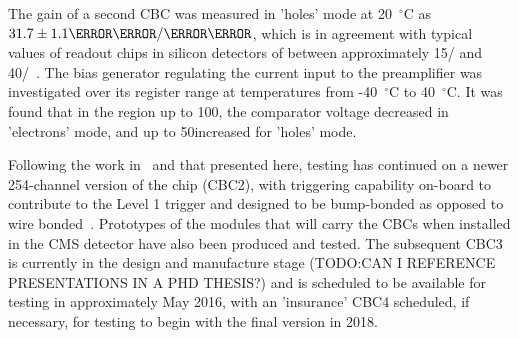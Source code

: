 The gain of a second CBC was measured in 'holes' mode at 20~$^{\circ}$C as $31.7\pm1.1\mathrm{\mV/\fC}$, which
is in agreement with typical values of readout chips in silicon detectors of between approximately 15\mV/\fC
and 40\mV/\fC~\cite{Kaplon:2001jh}. The bias generator regulating the current input to the preamplifier was
investigated over its register range at temperatures from -40~$^{\circ}$C to 40~$^{\circ}$C. It was found that in the region up to 100\uA, the
comparator voltage decreased in 'electrons' mode, and up to 50\uA increased for 'holes' mode. 

Following the work in~\cite{JacobJA} and that presented here, testing has continued on a newer 254-channel
version of the chip (CBC2), with triggering capability on-board to contribute to the Level 1 trigger and
designed to be bump-bonded as opposed to wire bonded~\cite{Klein:1628930,Abbaneo:1452189}.
Prototypes of the modules that will carry the CBCs when installed in the CMS detector have also been produced
and tested. The subsequent CBC3 is currently in the design and manufacture stage (TODO:CAN I REFERENCE
PRESENTATIONS IN A PHD THESIS?) and is scheduled to be available for testing in approximately May 2016, with
an 'insurance' CBC4 scheduled, if necessary, for testing to begin with the final version in 2018.
